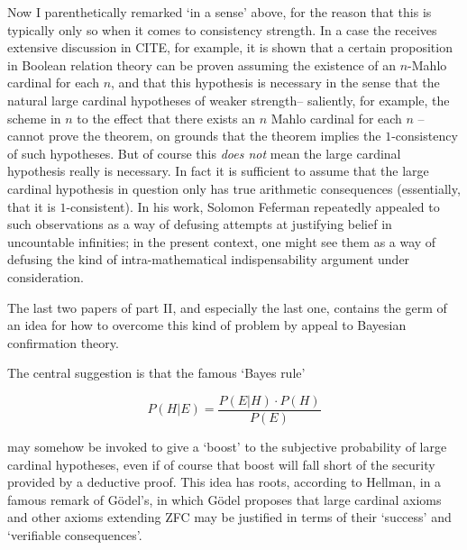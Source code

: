 \documentclass{article}
\theoremstyle{definition}
\begin{document}
Now I parenthetically remarked `in a sense' above, for the reason that
this is typically only so when it comes to consistency strength. 
In a case the receives extensive discussion in CITE, for example, it is shown 
that a certain proposition in Boolean relation theory can be proven assuming 
the existence of an $n$-Mahlo cardinal for each $n$, and that this hypothesis 
is necessary in the sense that the natural large cardinal hypotheses of 
weaker strength-- saliently, for example, the scheme in $n$ to the effect 
that there exists an $n$ Mahlo cardinal for each $n$ -- cannot prove the theorem, 
on grounds that the theorem implies the $1$-consistency of such hypotheses. But 
of course this \emph{does not} mean the large cardinal hypothesis really is necessary.
In fact it is sufficient to assume that the large cardinal hypothesis in question 
only has true arithmetic consequences (essentially, that it is $1$-consistent). 
In his work, Solomon Feferman repeatedly appealed to such observations 
as a way of defusing attempts at justifying belief in uncountable infinities;
in the present context, one might see them as a way of defusing the kind of 
intra-mathematical indispensability argument under consideration.

The last two papers of part II, and especially the last one, contains the germ
of an idea for how to overcome this kind of problem by appeal to Bayesian 
confirmation theory.

The central suggestion is that the famous `Bayes rule'

\begin{equation}
P(H|E) = \frac{P(E|H)\cdot P(H)}{P(E)}
\end{equation}

may somehow be invoked to give a `boost' to the subjective probability 
of large cardinal hypotheses, even if of course that boost will fall 
short of the security provided by a deductive proof. 
This idea has roots, according to Hellman, in a famous remark of G\"odel's, 
in which G\"odel proposes that large cardinal axioms and other axioms 
extending ZFC may be justified in terms of their `success' and 
`verifiable consequences'.
\end{document}
